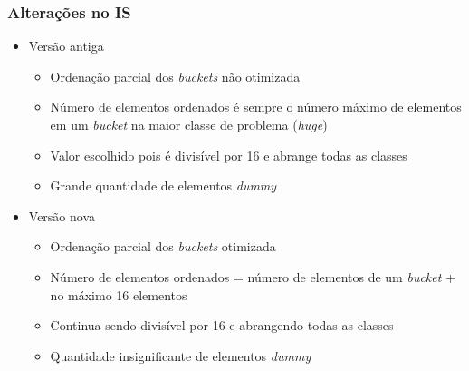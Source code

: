 \documentclass[xcolor={table}]{beamer}
\begin{document}
\begin{frame}\frametitle{Alterações no IS}
    \begin{itemize}
        \item {Versão antiga}
        \begin{itemize}
            \item {Ordenação parcial dos \textit{buckets} não otimizada}
            \item {Número de elementos ordenados é sempre o número máximo de elementos em um \textit{bucket} na maior classe de problema (\textit{huge})}
            \item {Valor escolhido pois é divisível por 16 e abrange todas as classes}
            \item {Grande quantidade de elementos \textit{dummy}}
        \end{itemize}
        \item {Versão nova}
        \begin{itemize}
            \item {Ordenação parcial dos \textit{buckets} otimizada}
            \item {Número de elementos ordenados = número de elementos de um \textit{bucket} + no máximo 16 elementos}
            \item {Continua sendo divisível por 16 e abrangendo todas as classes}
            \item {Quantidade insignificante de elementos \textit{dummy}}
        \end{itemize}
    \end{itemize}
\end{frame}
\end{document}
